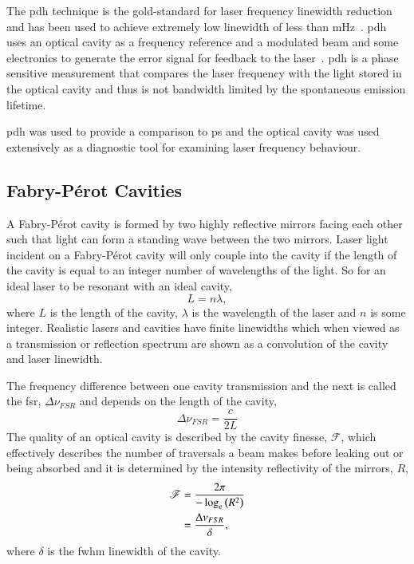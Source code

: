 The \gls{pdh} technique is the gold-standard for laser frequency linewidth reduction and has been used to achieve extremely low linewidth of less than \unit[40]{mHz}~\cite{kessler_sub-40-mhz-linewidth_2012}.
\Gls{pdh} uses an optical cavity as a frequency reference and a modulated beam and some electronics to generate the error signal for feedback to the laser~\cite{drever_laser_1983,black_introduction_2001}.
\Gls{pdh} is a phase sensitive measurement that compares the laser frequency with the light stored in the optical cavity and thus is not bandwidth limited by the spontaneous emission lifetime.

\Gls{pdh} was used to provide a comparison to \gls{ps} and the optical cavity was used extensively as a diagnostic tool for examining laser frequency behaviour.

\subsection{Fabry-P\'erot Cavities}\label{section:cavity_theory}
A Fabry-P\'erot cavity is formed by two highly reflective mirrors facing each other such that light can form a standing wave between the two mirrors.
Laser light incident on a Fabry-P\'erot cavity will only couple into the cavity if the length of the cavity is equal to an integer number of wavelengths of the light.
So for an ideal laser to be resonant with an ideal cavity,
\begin{equation}
L = n \lambda,
\end{equation}
where $L$ is the length of the cavity, $\lambda$ is the wavelength of the laser and $n$ is some integer.
Realistic lasers and cavities have finite linewidths which when viewed as a transmission or reflection spectrum are shown as a convolution of the cavity and laser linewidth.

The frequency difference between one cavity transmission and the next is called the \gls{fsr}, $\Delta \nu_{FSR}$ and depends on the length of the cavity,
\begin{equation}
\Delta \nu_{FSR} = \frac{c}{2L}
\end{equation}
The quality of an optical cavity is described by the cavity finesse, $\mathscr{F}$, which effectively describes the number of traversals a beam makes before leaking out or being absorbed and it is determined by the intensity reflectivity of the mirrors, $R$,
\begin{align}
\mathscr{F} &= \frac{2\pi}{-\log_e\left(R^2\right)} \notag\\
 &= \frac{\Delta \nu_{FSR}}{\delta},
\end{align}
where $\delta$ is the \gls{fwhm} linewidth of the cavity.


